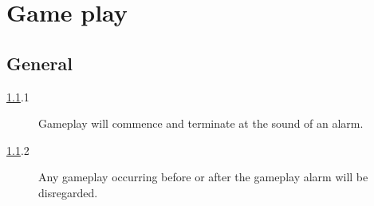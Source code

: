 \section {Game play}

\subsection {General}
\label {genplay}

\begin {description}
\item [\ref{genplay}.1] Gameplay will commence and terminate at the sound of an alarm.
\item [\ref{genplay}.2] Any gameplay occurring before or after the gameplay alarm will be disregarded.
\end {description}
